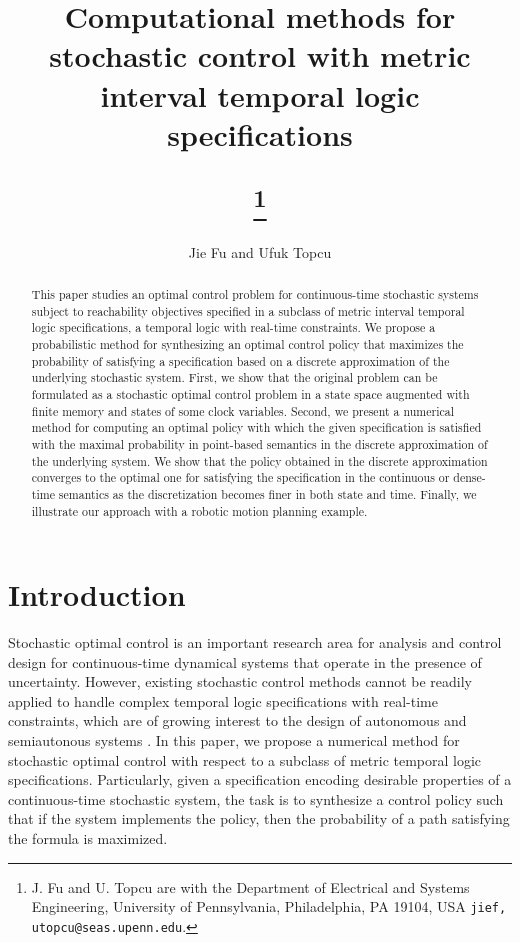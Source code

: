 \documentclass[letterpaper, 10 pt, conference]{ieeeconf}
\title{\LARGE \bf Computational methods for stochastic control with
  metric interval temporal logic
  specifications \author{Jie Fu and Ufuk Topcu}
\thanks{J. Fu and U. Topcu are with the Department of Electrical and
  Systems Engineering, University of Pennsylvania, Philadelphia, PA
  19104, USA  {\tt\small jief, utopcu@seas.upenn.edu}.}}
\begin{document}
\maketitle
\thispagestyle{empty}
\pagestyle{empty}


\begin{abstract}
  This paper studies an optimal control problem for continuous-time
  stochastic systems subject to reachability objectives specified in a
  subclass of metric interval temporal logic specifications, a
  temporal logic with real-time constraints. We propose a
  probabilistic method for synthesizing an optimal control policy that
  maximizes the probability of satisfying a specification based on a
  discrete approximation of the underlying stochastic system.  First,
  we show that the original problem can be formulated as a stochastic
  optimal control problem in a state space augmented with finite
  memory and states of some clock variables. Second, we present a
  numerical method for computing an optimal policy with which the
  given specification is satisfied with the maximal probability in
  point-based semantics in the discrete approximation of the
  underlying system. We show that the policy obtained in the discrete
  approximation converges to the optimal one for satisfying the
  specification in the continuous or dense-time semantics as the
  discretization becomes finer in both state and time.  Finally, we
  illustrate our approach with a robotic motion planning example.
\end{abstract}
\section{Introduction}
\label{sec:intro}
Stochastic optimal control is an important research area for analysis
and control design for continuous-time dynamical systems that operate
in the presence of uncertainty. However, existing stochastic control methods cannot be readily applied
to handle complex temporal logic specifications with real-time
constraints, which are of growing interest to the design of autonomous
and semiautonous systems
\cite{pnueli1992temporal,koymans1990specifying,fainekos2009temporal,wongpiromsarn2012receding}. In
this paper, we propose a numerical method for stochastic optimal
control with respect to a subclass of metric temporal logic
specifications. Particularly, given a specification encoding desirable
properties of a continuous-time stochastic system, the task is to
synthesize a control policy such that if the system implements the
policy, then the probability of a path satisfying the formula is
maximized.
\end{document}
